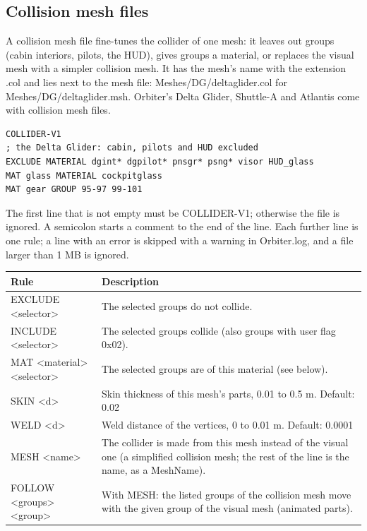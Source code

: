 \documentclass[Orbiter Developer Manual.tex]{subfiles}
\begin{document}
\begin{sloppypar}
\subsection{Collision mesh files}
A collision mesh file fine-tunes the collider of one mesh: it leaves out groups (cabin interiors, pilots, the HUD), gives groups a material, or replaces the visual mesh with a simpler collision mesh. It has the mesh's name with the extension .col and lies next to the mesh file: Meshes/DG/deltaglider.col for Meshes/DG/deltaglider.msh. Orbiter's Delta Glider, Shuttle-A and Atlantis come with collision mesh files.

\begin{lstlisting}[language=OSFS]
COLLIDER-V1
; the Delta Glider: cabin, pilots and HUD excluded
EXCLUDE MATERIAL dgint* dgpilot* pnsgr* psng* visor HUD_glass
MAT glass MATERIAL cockpitglass
MAT gear GROUP 95-97 99-101
\end{lstlisting}

\noindent
The first line that is not empty must be COLLIDER-V1; otherwise the file is ignored. A semicolon starts a comment to the end of the line. Each further line is one rule; a line with an error is skipped with a warning in Orbiter.log, and a file larger than 1 MB is ignored.

	\begin{longtable}{ |p{}|p{}| }
	\hline\rule{0pt}{2ex}
	\textbf{Rule} & \textbf{Description}\\
	\hline\rule{0pt}{2ex}
	EXCLUDE <selector> & The selected groups do not collide.\\
	\hline\rule{0pt}{2ex}
	INCLUDE <selector> & The selected groups collide (also groups with user flag 0x02).\\
	\hline\rule{0pt}{2ex}
	MAT <material> <selector> & The selected groups are of this material (see below).\\
	\hline\rule{0pt}{2ex}
	SKIN <d> & Skin thickness of this mesh's parts, 0.01 to 0.5 m. Default: 0.02\\
	\hline\rule{0pt}{2ex}
	WELD <d> & Weld distance of the vertices, 0 to 0.01 m. Default: 0.0001\\
	\hline\rule{0pt}{2ex}
	MESH <name> & The collider is made from this mesh instead of the visual one (a simplified collision mesh; the rest of the line is the name, as a MeshName).\\
	\hline\rule{0pt}{2ex}
	FOLLOW <groups> <group> & With MESH: the listed groups of the collision mesh move with the given group of the visual mesh (animated parts).\\
	\hline
	\end{longtable}


\end{sloppypar}
\end{document}
